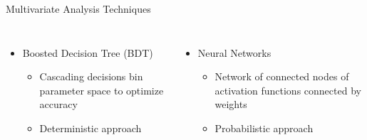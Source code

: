 \documentclass[aspectratio=169,xcolor=table]{beamer}
\begin{document}
    \begin{frame}[t]{Multivariate Analysis Techniques}
      \begin{columns}[t]
        \begin{itemize}
          \item Boosted Decision Tree (BDT)
          \begin{itemize}
            \item Cascading decisions bin parameter space to optimize accuracy
            \item Deterministic approach
          \end{itemize}
        \end{itemize}

        \begin{itemize}
          \item Neural Networks
          \begin{itemize}
            \item Network of connected nodes of activation functions connected by weights
            \item Probabilistic approach
          \end{itemize}
        \end{itemize}
      \end{columns}


\end{frame}
\end{document}
